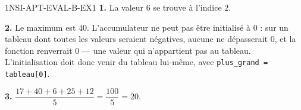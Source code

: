 \begin{corrige}{1NSI-APT-EVAL-B-EX1}
\textbf{1.} La valeur $6$ se trouve à l'indice $2$.

\textbf{2.} Le maximum est $40$. L'accumulateur ne peut pas être initialisé à $0$ : sur
un tableau dont toutes les valeurs seraient négatives, aucune ne dépasserait $0$, et la
fonction renverrait $0$ — une valeur qui n'appartient pas au tableau. L'initialisation doit
donc venir du tableau lui-même, avec \lstinline{plus_grand = tableau[0]}.

\textbf{3.} $\dfrac{17+40+6+25+12}{5}=\dfrac{100}{5}=20$.
\end{corrige}


